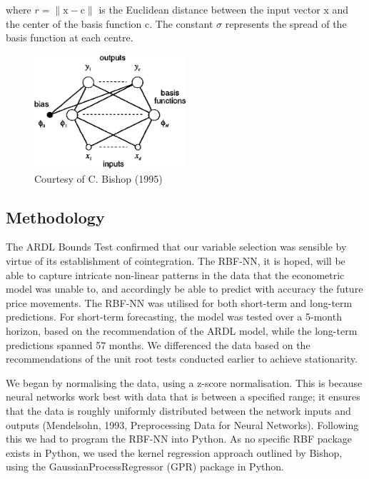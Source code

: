 \documentclass[12pt,a4paper]{article}
\begin{document}
where $r = \|\boldsymbol{\mathrm{x}} - \boldsymbol{\mathrm{c}}\|$ is the Euclidean distance between the input vector 
\(\boldsymbol{\mathrm{x}}\) and the center of the basis function 
\(\boldsymbol{\mathrm{c}}\). The constant $\sigma$ represents the
spread of the basis function at each centre.
\begin{figure}[h]
    \centering
    \includegraphics[width=0.5\textwidth]{bishopnn.png}
    \caption{Courtesy of C. Bishop (1995)}
    \label{fig:bishopnn}
\end{figure}

\subsection{Methodology}

The ARDL Bounds Test confirmed that our variable selection was sensible by virtue
of its establishment of cointegration. The RBF-NN, it is hoped, will be able
to capture intricate non-linear patterns in the data that the econometric model
was unable to, and accordingly be able to predict with accuracy the future price
movements. The RBF-NN was utilised for both short-term and long-term 
predictions. For short-term forecasting, 
the model was tested over a 5-month horizon, based on the recommendation of the
ARDL model, while the long-term predictions spanned 57 months. 
We differenced the data based on the recommendations of the 
unit root tests conducted earlier to achieve stationarity. 

We began by normalising the data, using a z-score normalisation. This is because
neural networks work best with data
that is between a specified range; it ensures that the data is roughly uniformly
distributed between the network inputs and outputs 
(Mendelsohn, 1993, Preprocessing Data for Neural Networks). Following this 
we had to program the RBF-NN into Python. As no specific RBF package exists
in Python, we used the kernel regression approach outlined by 
Bishop, using the GaussianProcessRegressor (GPR) package in Python.
\end{document}
